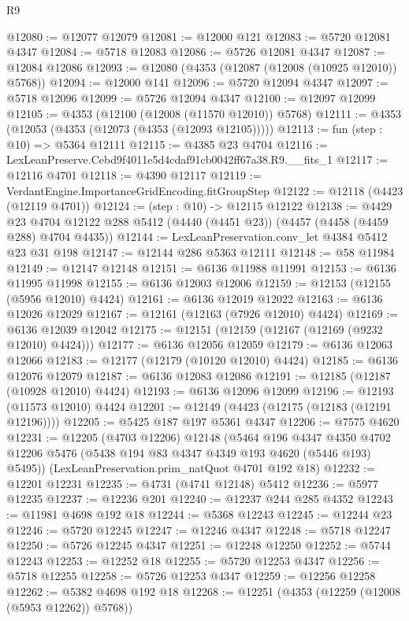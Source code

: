 \begin{lexlean}{R9}
\begin{coremodule}
@12080 := @12077 @12079
@12081 := @12000 @121
@12083 := @5720 @12081 @4347
@12084 := @5718 @12083
@12086 := @5726 @12081 @4347
@12087 := @12084 @12086
@12093 := @12080 (@4353 (@12087 (@12008 (@10925 @12010)) @5768))
@12094 := @12000 @141
@12096 := @5720 @12094 @4347
@12097 := @5718 @12096
@12099 := @5726 @12094 @4347
@12100 := @12097 @12099
@12105 := @4353 (@12100 (@12008 (@11570 @12010)) @5768)
@12111 := @4353 (@12053 (@4353 (@12073 (@4353 (@12093 @12105)))))
@12113 := fun (step : @10) => @5364 @12111
@12115 := @4385 @23 @4704
@12116 := LexLeanPreserve.Cebd9f4011e5d4cdaf91cb0042ff67a38.R9.__fits_1
@12117 := @12116 @4701
@12118 := @4390 @12117
@12119 := VerdantEngine.ImportanceGridEncoding.fitGroupStep
@12122 := @12118 (@4423 (@12119 @4701))
@12124 := (step : @10) -> @12115 @12122
@12138 := @4429
    @23
    @4704
    @12122
    @288
    @5412
    (@4440 (@4451 @23))
    (@4457 (@4458 (@4459 @288) @4704 @4435))
@12144 := LexLeanPreservation.conv_let @4384 @5412 @23 @31 @198
@12147 := @12144 @286 @5363 @12111
@12148 := @58 @11984
@12149 := @12147 @12148
@12151 := @6136 @11988 @11991
@12153 := @6136 @11995 @11998
@12155 := @6136 @12003 @12006
@12159 := @12153 (@12155 (@5956 @12010) @4424)
@12161 := @6136 @12019 @12022
@12163 := @6136 @12026 @12029
@12167 := @12161 (@12163 (@7926 @12010) @4424)
@12169 := @6136 @12039 @12042
@12175 := @12151 (@12159 (@12167 (@12169 (@9232 @12010) @4424)))
@12177 := @6136 @12056 @12059
@12179 := @6136 @12063 @12066
@12183 := @12177 (@12179 (@10120 @12010) @4424)
@12185 := @6136 @12076 @12079
@12187 := @6136 @12083 @12086
@12191 := @12185 (@12187 (@10928 @12010) @4424)
@12193 := @6136 @12096 @12099
@12196 := @12193 (@11573 @12010) @4424
@12201 := @12149 (@4423 (@12175 (@12183 (@12191 @12196))))
@12205 := @5425 @187 @197 @5361 @4347
@12206 := @7575 @4620
@12231 := @12205
    (@4703 @12206)
    @12148
    (@5464
      @196
      @4347
      @4350
      @4702
      @12206
      @5476
      (@5438 @194 @83 @4347 @4349 @193 @4620 (@5446 @193) @5495))
    (LexLeanPreservation.prim_natQuot @4701 @192 @18)
@12232 := @12201 @12231
@12235 := @4731 (@4741 @12148) @5412
@12236 := @5977 @12235
@12237 := @12236 @201
@12240 := @12237 @244 @285 @4352
@12243 := @11981 @4698 @192 @18
@12244 := @5368 @12243
@12245 := @12244 @23
@12246 := @5720 @12245
@12247 := @12246 @4347
@12248 := @5718 @12247
@12250 := @5726 @12245 @4347
@12251 := @12248 @12250
@12252 := @5744 @12243
@12253 := @12252 @18
@12255 := @5720 @12253 @4347
@12256 := @5718 @12255
@12258 := @5726 @12253 @4347
@12259 := @12256 @12258
@12262 := @5382 @4698 @192 @18
@12268 := @12251 (@4353 (@12259 (@12008 (@5953 @12262)) @5768))

\end{coremodule}
\end{lexlean}

